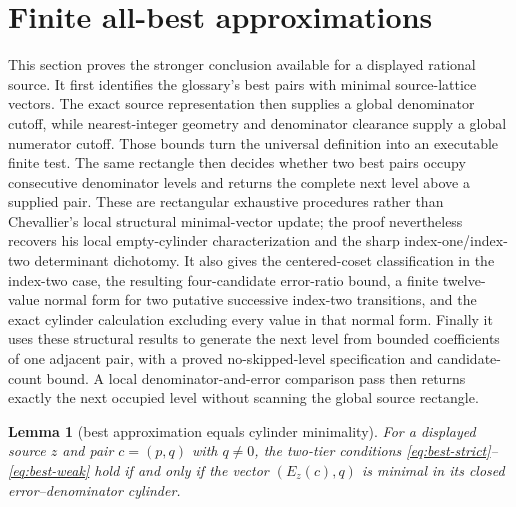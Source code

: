 \documentclass[11pt]{article}
\newtheorem{lemma}[lemma]{Lemma}
\begin{document}
\section{Finite all-best approximations}
\label{sec:all-best}

This section proves the stronger conclusion available for a displayed
rational source.  It first identifies the glossary's best pairs with minimal
source-lattice vectors.  The exact source representation then supplies a
global denominator cutoff, while nearest-integer geometry and denominator
clearance supply a global numerator cutoff.  Those bounds turn the universal
definition into an executable finite test.  The same rectangle then decides
whether two best pairs occupy consecutive denominator levels and returns the
complete next level above a supplied pair.  These are rectangular exhaustive
procedures rather than Chevallier's local structural minimal-vector update;
the proof nevertheless recovers his local empty-cylinder characterization and
the sharp index-one/index-two determinant dichotomy.  It also gives the
centered-coset classification in the index-two case, the resulting
four-candidate error-ratio bound, a finite twelve-value normal form for
two putative successive index-two transitions, and the exact cylinder
calculation excluding every value in that normal form.  Finally it uses these
structural results to generate the next level from bounded coefficients of one
adjacent pair, with a proved no-skipped-level specification and candidate-count
bound.  A local denominator-and-error comparison pass then returns exactly the
next occupied level without scanning the global source rectangle.

\begin{lemma}[best approximation equals cylinder minimality]
\label{lem:best-equals-minimal}
For a displayed source $z$ and pair $c=(p,q)$ with $q\ne0$, the two-tier
conditions \eqref{eq:best-strict}--\eqref{eq:best-weak} hold if and only if
the vector $(E_z(c),q)$ is minimal in its closed error--denominator cylinder.
\end{lemma}
\end{document}
